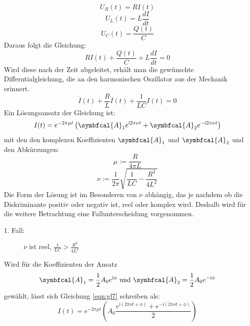 \begin{equation}
  U_R(t) = RI(t)
  \label{eqn:gl2}
\end{equation}
\begin{equation}
  U_L(t) = L \frac{dI}{dt}
  \label{eqn:gl3}
\end{equation}
\begin{equation}
  U_C(t) = \frac{Q(t)}{C}
  \label{eqn:gl4}
\end{equation}
Daraus folgt die Gleichung:
\begin{equation}
  RI(t) + \frac{Q(t)}{C} + L \frac{dI}{dt} = 0
  \label{eqn:gl5}
\end{equation}
Wird diese nach der Zeit abgeleitet, erhält man die gewünschte Differntialgleichung, die an den harmonischen Oszillator aus der Mechanik erinnert.
\begin{equation}
  \ddot{I}(t) + \frac{R}{L} \dot{I}(t) + \frac{1}{LC}I(t) = 0
  \label{eqn:gl6}
\end{equation}
Ein Lösungsansatz der Gleichung ist:
\begin{equation}
  I(t) = e^{-2\pi\mu t}\left(\symbfcal{A}_1 e^{\text{i}2\pi\nu t} + \symbfcal{A}_2 e^{-\text{i}2\pi\nu t}\right)
  \label{eqn:gl7}
\end{equation}
mit den den komplexen Koeffizienten $\symbfcal{A}_1$ und $\symbfcal{A}_2$ und den Abkürzungen:
\begin{equation}
  \mu := \frac{R}{4\pi L}
  \label{eqn:gl8}
\end{equation}
\begin{equation}
  \nu := \frac{1}{2\pi} \sqrt{\frac{1}{LC} - \frac{R^2}{4L^2}}
  \label{eqn:gl9}
\end{equation}
Die Form der Lösung ist im Besonderen von $\nu$ abhängig, das je nachdem ob die Diskriminante positiv oder negativ ist, reel oder komplex wird.
Deshalb wird für die weitere Betrachtung eine Fallunterscheidung vorgenommen.
\begin{description}
  \item[1. Fall:] $\nu$ ist reel, $\frac{1}{LC} > \frac{R^2}{4L^2}$
\end{description}
Wird für die Koeffizienten der Ansatz
\begin{equation*}
  \symbfcal{A}_1 = \frac{1}{2} A_0 e^{\text{i}\phi} \text{ und } \symbfcal{A}_2 = \frac{1}{2} A_0 e^{-\text{i}\phi}
\end{equation*}
gewählt, lässt sich Gleichung \eqref{eqn:gl7} schreiben als:
\begin{equation}
  I(t) = e^{-2\pi\mu t}\left(A_0 \frac{e^{\text{i}(2\pi\nu t + \phi)} + e^{-\text{i}(2\pi\nu t + \phi)}}{2}\right)
  \label{eqn:gl10}
\end{equation}
